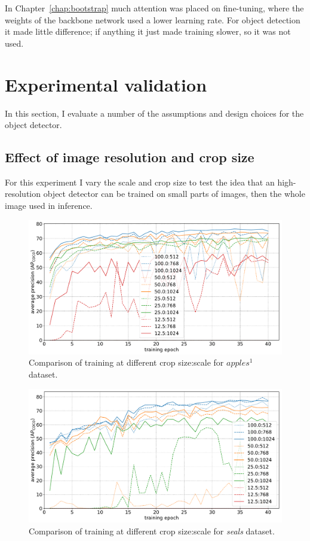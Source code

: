 In Chapter~\ref{chap:bootstrap} much attention was placed on fine-tuning, where the weights of the backbone network used a lower learning rate. For object detection it made little difference; if anything it just made training slower, so it was not used.


\section {Experimental validation}
\label{sec:experimental_validation}

In this section, I evaluate a number of the assumptions and design choices for the object detector.

\subsection {Effect of image resolution and crop size}
\label{sec:scale_crop}

For this experiment I vary the scale and crop size to test the idea that an high-resolution object detector can be trained on small parts of images, then the whole image used in inference.

\begin{figure}[htb]
  \centering
  \includegraphics[width=1.0\linewidth]{charts/training/crops_scales/penguins.pdf}
  \caption{Comparison of training at different crop size:scale for $apples^1$ dataset. }  
  \label{fig:apples_crop_scale}
\end{figure}

 
\begin{figure}[htb]
  \centering
  \includegraphics[width=1.0\linewidth]{charts/training/crops_scales/seals.pdf}
  \caption{Comparison of training at different crop size:scale for \emph{seals} dataset. }  
  \label{fig:seals_crop_scale}
\end{figure}


